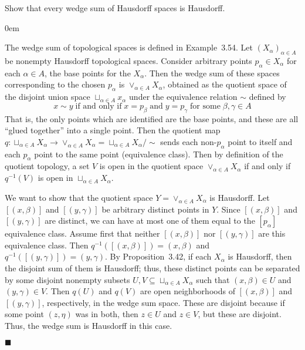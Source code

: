 \documentclass[12pt]{article}
\renewcommand{\qed}{\hfill$\blacksquare$}
\renewenvironment{proof}{\begin{addmargin}[1em]{0em}\begin{newproof}}{\end{newproof}\end{addmargin}\qed}
\newenvironment{exercise}[2][Exercise]{\begin{trivlist}
\item[\hskip \labelsep {\bfseries #1}\hskip \labelsep {\bfseries #2.}]}{\end{trivlist}}
\begin{document}
\begin{exercise}{3.55}
Show that every wedge sum of Hausdorff spaces is Hausdorff.
\end{exercise}
\begin{proof}
The wedge sum of topological spaces is defined in Example~3.54. Let $\left(X_{\alpha}\right)_{\alpha \in A}$ be nonempty Hausdorff topological spaces. Consider arbitrary points $p_{\alpha} \in X_{\alpha}$ for each $\alpha\in A$, the base points for the $X_{\alpha}$. Then the wedge sum of these spaces corresponding to the chosen $p_{\alpha}$ is $\vee_{\alpha \in A} X_{\alpha}$, obtained as the quotient space of the disjoint union space $\sqcup_{\alpha \in A} x_{\alpha}$ under the equivalence relation $\sim$ defined by $$ x \sim y \; \text{if and only if} \; x=p_{\beta} \; \text{and} \; y=p_{\gamma} \; \text{for some} \; \beta, \gamma \in A $$That is, the only points which are identified are the base points, and these are all ``glued together'' into a single point. Then the quotient map $q:\sqcup_{\alpha \in A} X_{\alpha} \rightarrow \vee_{\alpha \in A} X_{\alpha} = \sqcup_{\alpha \in A} X_{\alpha} / \sim $ sends each non-$p_{\alpha}$ point to itself and each $p_{\alpha}$ point to the same point (equivalence class). Then by definition of the quotient topology, a set $V$ is open in the quotient space $\vee_{\alpha \in A} X_{\alpha} $ if and only if $q^{-1}\left(V\right)$ is open in $\sqcup_{\alpha \in A} X_{\alpha}$.

We want to show that the quotient space $Y= \vee_{\alpha \in A} X_{\alpha} $ is Hausdorff. Let $\left[\left(x,\beta\right)\right]$ and $\left[\left(y,\gamma\right)\right]$ be arbitrary distinct points in $Y$. Since $\left[\left(x,\beta\right)\right]$ and $\left[\left(y,\gamma\right)\right]$ are distinct, we can have at most one of them equal to the $\left[p_{\alpha}\right]$ equivalence class. Assume first that neither $\left[\left(x,\beta\right)\right]$ nor $\left[\left(y,\gamma\right)\right]$ are this equivalence class. Then $q^{-1}\left(\left[\left(x,\beta\right)\right] \right) = \left(x,\beta\right)$ and $q^{-1}\left(\left[\left(y,\gamma\right)\right]\right)=\left(y,\gamma\right)$. By Proposition~3.42, if each $X_{\alpha}$ is Hausdorff, then the disjoint sum of them is Hausdorff; thus, these distinct points can be separated by some disjoint nonempty subsets $U,V \subseteq \sqcup_{\alpha \in A} X_{\alpha}$ such that $\left(x,\beta\right) \in U$ and $\left(y,\gamma\right) \in V$. Then $q\left(U\right)$ and $q\left(V\right)$ are open neighborhoods of $\left[\left(x,\beta\right)\right]$ and $\left[\left(y,\gamma\right)\right]$, respectively, in the wedge sum space. These are disjoint because if some point $\left(z,\eta\right)$ was in both, then $z\in U$ and $z\in V$, but these are disjoint. Thus, the wedge sum is Hausdorff in this case.


\end{proof}
\end{document}
